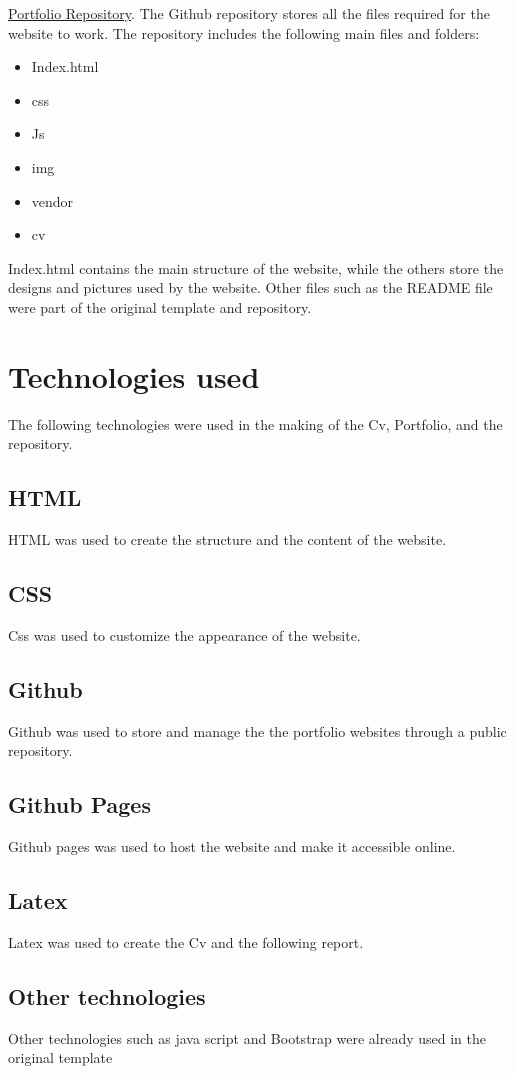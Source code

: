 \documentclass{article}
\begin{document}
\href{https://github.com/Eizeldeen-Marzouq/EizeldeenMarzouq-Portfolio}{Portfolio Repository}.
The Github repository stores all the files required for the website to work.
The repository includes the following main files and folders:
\begin{itemize}
    \item Index.html
    \item css
    \item Js
    \item img
    \item vendor
    \item cv
    
\end{itemize}
Index.html contains the main structure of the website, while the others store the designs and pictures used by the website.
Other files such as the README file were part of the original template and repository.
\section{Technologies used}
The following technologies were used in the making of the Cv, Portfolio, and the repository.
\subsection{HTML}
HTML was used to create the structure and the content of the website.
\subsection{CSS}
Css was used to customize the appearance of the website.
\subsection{Github}
Github was used to store and manage the the portfolio websites through a public repository.
\subsection{Github Pages}
Github pages was used to host the website and make it accessible online.
\subsection{Latex}
Latex was used to create the Cv and the following report.
\subsection{Other technologies}
Other technologies such as java script and Bootstrap were already used in the original template
\end{document}
